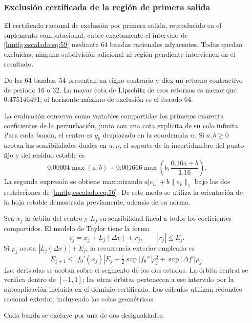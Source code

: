 \subsubsection{Exclusión certificada de la región de primera salida}
\label{hmtfg:escalado:16.3}

El certificado racional de exclusión por primera salida, reproducido en el suplemento computacional, cubre exactamente el intervalo de \eqref{hmtfg:escalado:eq:59} mediante 64 bandas racionales adyacentes. Todas quedan excluidas; ninguna subdivisión adicional ni región pendiente intervienen en el resultado.

De las 64 bandas, 54 presentan un signo contrario y diez un retorno contractivo de período 16 o 32. La mayor cota de Lipschitz de esos retornos es menor que \(0.475146491\); el horizonte máximo de exclusión es el iterado 64.

La evaluación conserva como variables compartidas los primeros cuarenta coeficientes de la perturbación, junto con una cota explícita de su cola infinita. Para cada banda, el centro es \(g_0\) desplazado en la coordenada \(u\). Si \(a,b\ge0\) acotan las sensibilidades duales en \(u,\nu\), el soporte de la incertidumbre del punto fijo y del residuo estable es
\begin{equation}
0.00004\max(a,b)
+0.001666\max\left(b,\frac{0.16a+b}{1.16}\right).
\label{hmtfg:escalado:eq:61}
\end{equation}
La segunda expresión se obtiene maximizando \(a|e_u|+b\|e_\nu\|_1\) bajo las dos restricciones de \eqref{hmtfg:escalado:eq:56}. De este modo se utiliza la orientación de la hoja estable demostrada previamente, además de su norma.

Sea \(x_j\) la órbita del centro y \(L_j\) su sensibilidad lineal a todos los coeficientes compartidos. El modelo de Taylor tiene la forma
\[
c_j=x_j+L_j(\Delta v)+r_j,\qquad |r_j|\le E_j.
\]
Si \(\rho_j\) acota \(|L_j(\Delta v)|+E_j\), la recurrencia exterior empleada es
\begin{equation}
E_{j+1}\le |f_0'(x_j)|E_j
+\tfrac12\sup|f_0''|\rho_j^2
+\sup|\Delta f'|\rho_j.
\label{hmtfg:escalado:eq:62}
\end{equation}
Las derivadas se acotan sobre el segmento de los dos estados. La órbita central se verifica dentro de \([-1,1]\); las otras órbitas pertenecen a ese intervalo por la autoaplicación incluida en el dominio certificado. Los cálculos utilizan redondeo racional exterior, incluyendo las colas geométricas.

Cada banda se excluye por una de dos desigualdades:

